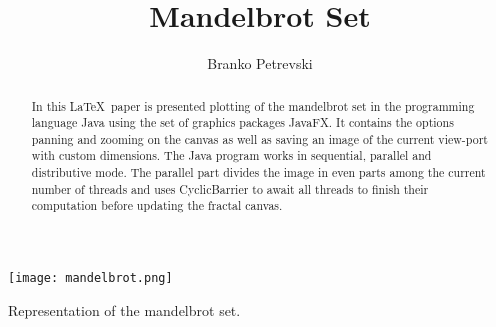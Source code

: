 \documentclass[sigconf]{acmart}
\begin{document}
\title{Mandelbrot Set}


\author{Branko Petrevski}

\renewcommand{\shortauthors}{Branko Petrevski}

\begin{abstract}
  In this \LaTeX\ paper is presented plotting of the mandelbrot set in the programming language Java using the set of graphics packages JavaFX. It contains the options panning and zooming on the canvas as well as saving an image of the current view-port with custom dimensions. The Java program works in sequential, parallel and distributive mode. The parallel part divides the image in even parts among the current number of threads and uses CyclicBarrier to await all threads to finish their computation before updating the fractal canvas.
\end{abstract}

\begin{teaserfigure}
  \texttt{[image: mandelbrot.png]}
  \caption{Representation of the mandelbrot set.}
  \label{fig:teaser}
\end{teaserfigure}
\end{document}
